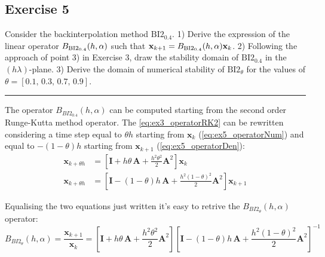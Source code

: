 \documentclass[11pt,a4paper,oneside]{article}
\renewcommand{\vec}[1]{\mathbf{#1}}
\begin{document}
\clearpage
\subsection{Exercise 5}
Consider the backinterpolation method $\textrm{BI2}_{0.4}$. 1) Derive the expression of the linear operator $B_{\rm BI2_{0.4}}(h,\alpha)$ such that $\vec x_{k+1} = B_{\rm BI2_{0.4}}(h,\alpha) \vec x_k$. 2) Following the approach of point 3) in Exercise 3, draw the stability domain of $\textrm{BI2}_{0.4}$ in the $(h\lambda)$-plane. 3) Derive the domain of numerical stability of $\textrm{BI2}_{\theta}$ for the values of $\theta = [0.1,\, 0.3,\, 0.7,\, 0.9]$.

\medskip \hrule \medskip

The operator $B_{BI2_{0.4}}(h,\alpha)$ can be computed starting from the second order Runge-Kutta method operator.
The \cref{eq:ex3_operatorRK2} can be rewritten considering a time step equal to $\theta h$ starting from $\vec{x}_k$ (\cref{eq:ex5_operatorNum}) and equal to $-(1-\theta)h$ starting from $\vec{x}_{k+1}$ (\cref{eq:ex5_operatorDen}):
\begin{subequations}
    \begin{align}
        \vec{x}_{k+\theta h} &= \left[ \vec{I} + h \theta\,    \vec{A} + \frac{h^2 \theta^2}{2} \vec{A}^2 \right] \vec{x}_k         \label{eq:ex5_operatorNum}\\
        \vec{x}_{k+\theta h} &= \left[ \vec{I} - (1-\theta)h\, \vec{A} + \frac{h^2 (1-\theta)^2}{2} \vec{A}^2 \right] \vec{x}_{k+1} \label{eq:ex5_operatorDen}
    \end{align}
\end{subequations}

Equalising the two equations just written it's easy to retrive the $B_{BI2_{\theta}}(h,\alpha)$ operator:
\begin{equation}
    B_{BI2_{\theta}}(h,\alpha) = \frac{\vec{x}_{k+1}}{\vec{x}_k}
                               = \left[ \vec{I} + h \theta\, \vec{A} + \frac{h^2 \theta^2}{2} \vec{A}^2 \right] \left[ \vec{I} - (1-\theta)h\, \vec{A} + \frac{h^2 (1-\theta)^2}{2} \vec{A}^2 \right] ^{-1}
    \label{eq:ex5_operatorBI}
\end{equation}
\end{document}
